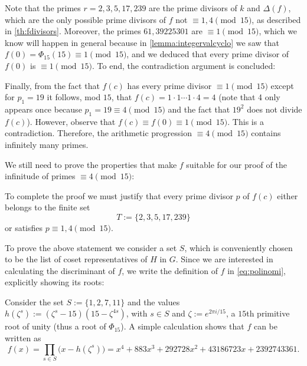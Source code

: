 \documentclass[../main.tex]{subfiles}
\begin{document}
  Note that the primes $r=2, 3, 5, 17, 239$ are the prime divisors of $k$ and $\Delta(f)$, which are the only possible prime divisors of $f$ not $\equiv 1, 4\pmod{15}$, as described in \cref{th:fdivisors}. Moreover, the primes $61, 39225301$ are $\equiv 1 \pmod{15}$, which we know will happen in general because in \cref{lemma:integervalcyclo} we saw that $f(0)=\Phi_{15}(15)\equiv 1 \pmod{15}$, and we deduced that every prime divisor of $f(0)$ is $\equiv 1\pmod{15}$. To end, the contradiction argument is concluded:\\
 
 \begin{mdframed}\small
 	Finally, from the fact that $f(c)$ has every prime divisor $\equiv 1 \pmod{15}$ except for $p_{1}=19$ it follows, mod $15$, that $f(c)=1\cdot1\cdots 1\cdot4=4$ (note that 4 only appears once because $p_{1}=19\equiv4\pmod{15}$ and the fact that $19^2$ does not divide $f(c)$). However, observe that $f(c)\equiv f(0)\equiv 1\pmod{15}$. This is a contradiction. Therefore, the arithmetic progression $\equiv 4\pmod{15}$ contains infinitely many primes.
 \end{mdframed}
 
 We still need to prove the properties that make $f$ suitable for our proof of the infinitude of primes $\equiv 4 \pmod{15}$:\\
 
 \begin{mdframed}\small
To complete the proof we must justify that every prime divisor $p$ of $f(c)$ either belongs to the finite set 
\begin{equation}\label{eq:primedivisors}
	T:=\{2, 3, 5, 17, 239\}
\end{equation}
or satisfies $p\equiv 1,4\pmod{15}$.
 \end{mdframed}
 
 To prove the above statement we consider a set $S$, which is conveniently chosen to be the list of coset representatives of $H$ in $G$. Since we are interested in calculating the discriminant of $f$, we write the definition of $f$ in \cref{eq:polinomi}, explicitly showing its roots:\\
 
 \begin{mdframed}\small
Consider the set $S:=\{1, 2, 7, 11\}$ and the values $h(\zeta^{s}):=(\zeta^{s}-15)(15-\zeta^{4s})$, with $s\in S$ and $\zeta:=e^{2\pi i/{15}}$, a $15$th primitive root of unity (thus a root of $\Phi_{15}$). A simple calculation shows that $f$ can be written as
\begin{equation}\label{eq:fpolynomial}
f(x)=\prod_{s\in S}\big(x-h(\zeta^{s})\big)=x^{4} + 883 x^{3} + 292728 x^{2} + 43186723 x + 2392743361.
\end{equation}
 \end{mdframed}
 
\end{document}
